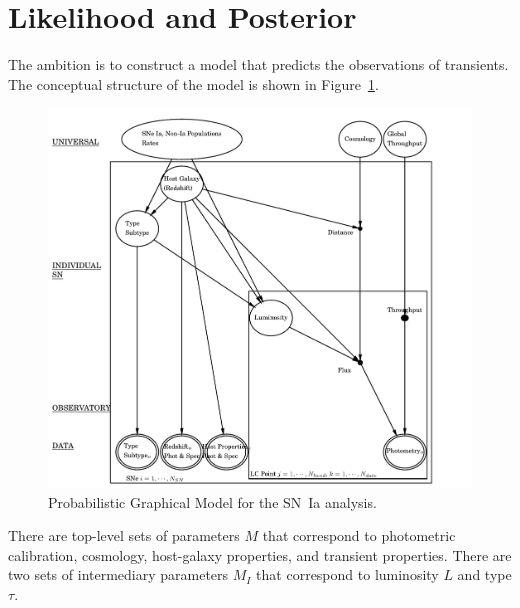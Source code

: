 \documentclass[preprint,3p]{elsarticle}
\begin{document}
%
%

\section{Likelihood and Posterior}
\label{likelihood:sec}

The ambition is to construct a model that predicts the observations of
transients.
The conceptual structure of the model is shown in Figure~\ref{pgm:fig}. 
\begin{figure}[htbp] %
   \centering
   \includegraphics[width=6.5in]{../results//hdpgm.pdf} 
   \caption{Probabilistic Graphical Model for the SN~Ia analysis.  
   \label{pgm:fig}}
\end{figure}

There are top-level  sets of parameters $M$ that correspond to photometric calibration, cosmology,
host-galaxy properties, and transient properties.
There are two sets of intermediary parameters $M_I$ that correspond to luminosity $L$ and type $\tau$.
\end{document}
